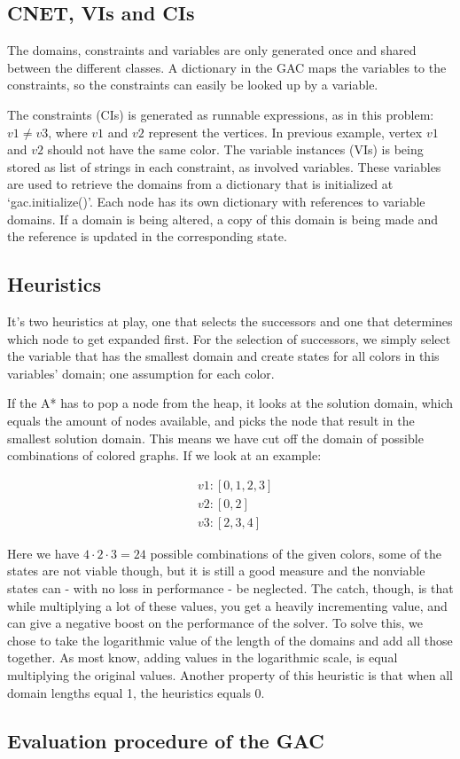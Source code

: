 

\subsection{CNET, VIs and CIs}
The domains, constraints and variables are only generated once and shared between the different classes. A dictionary in the GAC maps the variables to the constraints, so the constraints can easily be looked up by a variable.

The constraints (CIs) is generated as runnable expressions, as in this problem: \( v1 \neq v3 \), where \(v1\) and \(v2\) represent the vertices. In previous example, vertex \(v1\) and \(v2\) should not have the same color. The variable instances (VIs) is being stored as list of strings in each constraint, as involved variables. These variables are used to retrieve the domains from a dictionary that is initialized at `gac.initialize()'. Each node has its own dictionary with references to variable domains. If a domain is being altered, a copy of this domain is being made and the reference is updated in the corresponding state.

\subsection*{Heuristics}
It's two heuristics at play, one that selects the successors and one that determines which node to get expanded first. For the selection of successors, we simply select the variable that has the smallest domain and create states for all colors in this variables' domain; one assumption for each color.

If the A* has to pop a node from the heap, it looks at the solution domain, which equals the amount of nodes available, and picks the node that result in the smallest solution domain. This means we have cut off the domain of possible combinations of colored graphs. If we look at an example:

\begin{align*}
	&v1: [0,1,2,3]\\
	&v2: [0,2]\\
	&v3: [2,3,4]
\end{align*}

Here we have \(4 \cdot 2 \cdot 3 = 24\) possible combinations of the given colors, some of the states are not viable though, but it is still a good measure and the nonviable states can - with no loss in performance - be neglected. The catch, though, is that while multiplying a lot of these values, you get a heavily incrementing value, and can give a negative boost on the performance of the solver. To solve this, we chose to take the logarithmic value of the length of the domains and add all those together. As most know, adding values in the logarithmic scale, is equal multiplying the original values. Another property of this heuristic is that when all domain lengths equal 1, the heuristics equals 0.

\subsection{Evaluation procedure of the GAC}
